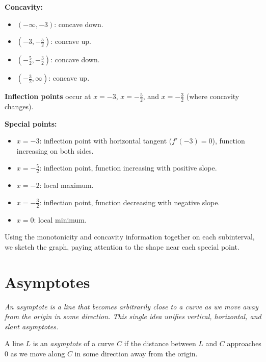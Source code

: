 \begin{example}
\textbf{Concavity:}
\begin{itemize}
  \item $(-\infty, -3)$: concave down.
  \item $(-3, -\frac{5}{2})$: concave up.
  \item $(-\frac{5}{2}, -\frac{3}{2})$: concave down.
  \item $(-\frac{3}{2}, \infty)$: concave up.
\end{itemize}

\textbf{Inflection points} occur at $x = -3$, $x = -\frac{5}{2}$, and $x = -\frac{3}{2}$ (where concavity changes).

\textbf{Special points:}
\begin{itemize}
  \item $x = -3$: inflection point with horizontal tangent ($f'(-3) = 0$), function increasing on both sides.
  \item $x = -\frac{5}{2}$: inflection point, function increasing with positive slope.
  \item $x = -2$: local maximum.
  \item $x = -\frac{3}{2}$: inflection point, function decreasing with negative slope.
  \item $x = 0$: local minimum.
\end{itemize}

Using the monotonicity and concavity information together on each subinterval, we sketch the graph, paying attention to the shape near each special point.
\end{example}

\section{Asymptotes}
\label{sec:6.15}

\textit{An asymptote is a line that becomes arbitrarily close to a curve as we move away from the origin in some direction.  This single idea unifies vertical, horizontal, and slant asymptotes.}

\begin{definition}
\label{def:6-4}
A line $L$ is an \emph{asymptote} of a curve $C$ if the distance between $L$ and $C$ approaches $0$ as we move along $C$ in some direction away from the origin.
\end{definition}

